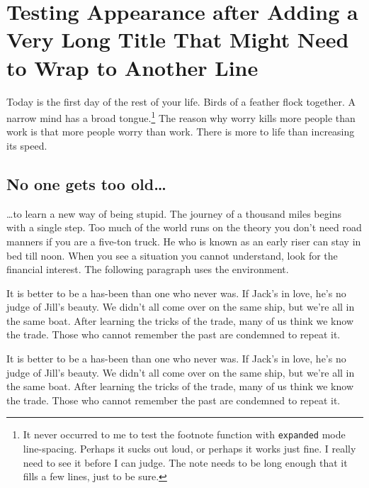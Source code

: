 
\chapter{Testing Appearance after Adding a Very Long Title That
  Might Need to Wrap to Another Line}

Today is the first day of the rest of your life.  Birds of a feather
flock together. A narrow mind has a broad tongue.\footnote{It never
  occurred to me to test the footnote function with \texttt{expanded}
  mode line-spacing.  Perhaps it sucks out loud, or perhaps it works
  just fine.  I really need to see it before I can judge. The note
  needs to be long enough that it fills a few lines, just to be sure.}
The reason why worry kills more people than work is that more people
worry than work.  There is more to life than increasing its speed.

\section{No one gets too old\ldots}
\ldots to learn a new way of being stupid.  The journey of a thousand
miles begins with a single step.  Too much of the world runs on the
theory you don't need road manners if you are a five-ton truck.  He
who is known as an early riser can stay in bed till noon.  When you
see a situation you cannot understand, look for the financial
interest.  The following paragraph uses the 
environment.

\begin{singlespaced}
It is better to be a has-been than one who never was.  If Jack's in
love, he's no judge of Jill's beauty.  We didn't all come over on the
same ship, but we're all in the same boat.  After learning the tricks
of the trade, many of us think we know the trade.  Those who cannot
remember the past are condemned to repeat it.
\end{singlespaced}
It is better to be a has-been than one who never was.  If Jack's in
love, he's no judge of Jill's beauty.  We didn't all come over on the
same ship, but we're all in the same boat.  After learning the tricks
of the trade, many of us think we know the trade.  Those who cannot
remember the past are condemned to repeat it.

